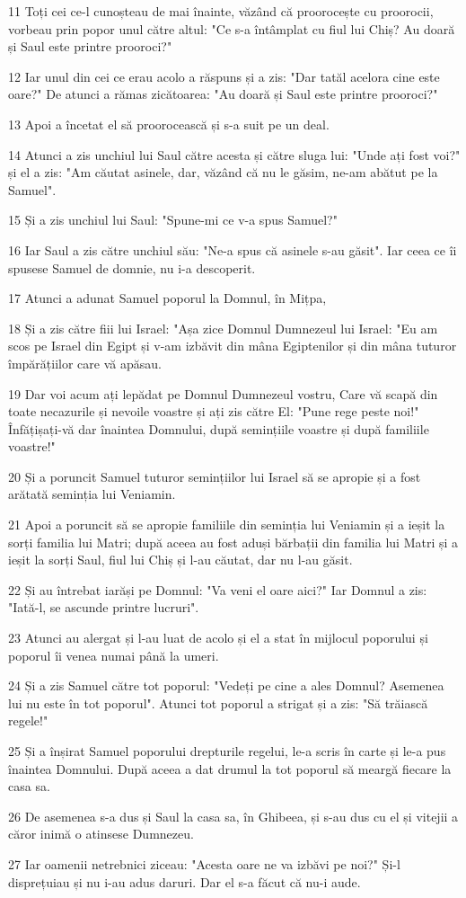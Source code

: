 \par 11 Toți cei ce-l cunoșteau de mai înainte, văzând că proorocește cu proorocii, vorbeau prin popor unul către altul: "Ce s-a întâmplat cu fiul lui Chiș? Au doară și Saul este printre prooroci?"
\par 12 Iar unul din cei ce erau acolo a răspuns și a zis: "Dar tatăl acelora cine este oare?" De atunci a rămas zicătoarea: "Au doară și Saul este printre prooroci?"
\par 13 Apoi a încetat el să proorocească și s-a suit pe un deal.
\par 14 Atunci a zis unchiul lui Saul către acesta și către sluga lui: "Unde ați fost voi?" și el a zis: "Am căutat asinele, dar, văzând că nu le găsim, ne-am abătut pe la Samuel".
\par 15 Și a zis unchiul lui Saul: "Spune-mi ce v-a spus Samuel?"
\par 16 Iar Saul a zis către unchiul său: "Ne-a spus că asinele s-au găsit". Iar ceea ce îi spusese Samuel de domnie, nu i-a descoperit.
\par 17 Atunci a adunat Samuel poporul la Domnul, în Mițpa,
\par 18 Și a zis către fiii lui Israel: "Așa zice Domnul Dumnezeul lui Israel: "Eu am scos pe Israel din Egipt și v-am izbăvit din mâna Egiptenilor și din mâna tuturor împărățiilor care vă apăsau.
\par 19 Dar voi acum ați lepădat pe Domnul Dumnezeul vostru, Care vă scapă din toate necazurile și nevoile voastre și ați zis către El: "Pune rege peste noi!" Înfățișați-vă dar înaintea Domnului, după semințiile voastre și după familiile voastre!"
\par 20 Și a poruncit Samuel tuturor semințiilor lui Israel să se apropie și a fost arătată seminția lui Veniamin.
\par 21 Apoi a poruncit să se apropie familiile din seminția lui Veniamin și a ieșit la sorți familia lui Matri; după aceea au fost aduși bărbații din familia lui Matri și a ieșit la sorți Saul, fiul lui Chiș și l-au căutat, dar nu l-au găsit.
\par 22 Și au întrebat iarăși pe Domnul: "Va veni el oare aici?" Iar Domnul a zis: "Iată-l, se ascunde printre lucruri".
\par 23 Atunci au alergat și l-au luat de acolo și el a stat în mijlocul poporului și poporul îi venea numai până la umeri.
\par 24 Și a zis Samuel către tot poporul: "Vedeți pe cine a ales Domnul? Asemenea lui nu este în tot poporul". Atunci tot poporul a strigat și a zis: "Să trăiască regele!"
\par 25 Și a înșirat Samuel poporului drepturile regelui, le-a scris în carte și le-a pus înaintea Domnului. După aceea a dat drumul la tot poporul să meargă fiecare la casa sa.
\par 26 De asemenea s-a dus și Saul la casa sa, în Ghibeea, și s-au dus cu el și vitejii a căror inimă o atinsese Dumnezeu.
\par 27 Iar oamenii netrebnici ziceau: "Acesta oare ne va izbăvi pe noi?" Și-l disprețuiau și nu i-au adus daruri. Dar el s-a făcut că nu-i aude.

